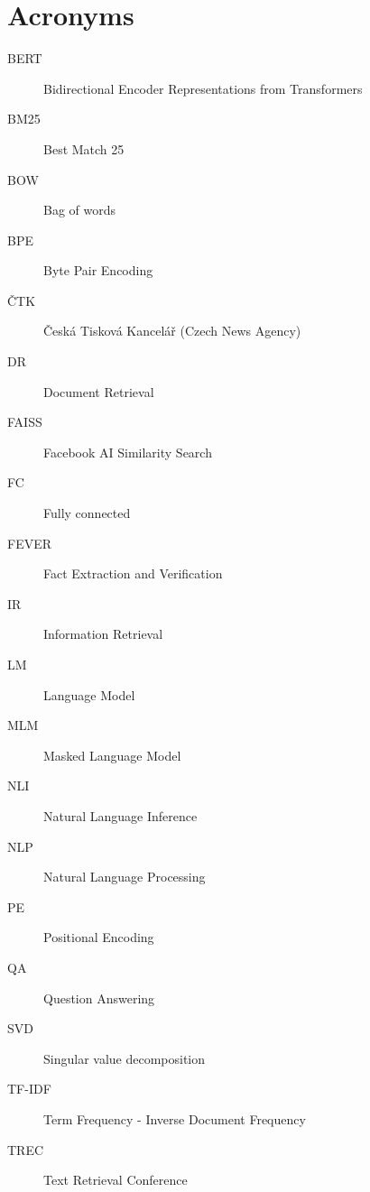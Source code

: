 \chapter*{Acronyms}
\begin{description}
    \item[BERT]  Bidirectional Encoder Representations from Transformers
    \item[BM25]  Best Match 25
    \item[BOW]  Bag of words
    \item[BPE]  Byte Pair Encoding
    \item[ČTK]  Česká Tisková Kancelář (Czech News Agency)
    \item[DR]   Document Retrieval
    \item[FAISS] Facebook AI Similarity Search
    \item[FC]   Fully connected
    \item[FEVER]   Fact Extraction and Verification
    \item[IR]   Information Retrieval
    \item[LM]   Language Model
    \item[MLM]   Masked Language Model
    \item[NLI]   Natural Language Inference
    \item[NLP]   Natural Language Processing
    \item[PE]   Positional Encoding
    \item[QA]   Question Answering
    \item[SVD]   Singular value decomposition
    \item[TF-IDF]   Term Frequency - Inverse Document Frequency
    \item[TREC]   Text Retrieval Conference
\end{description}